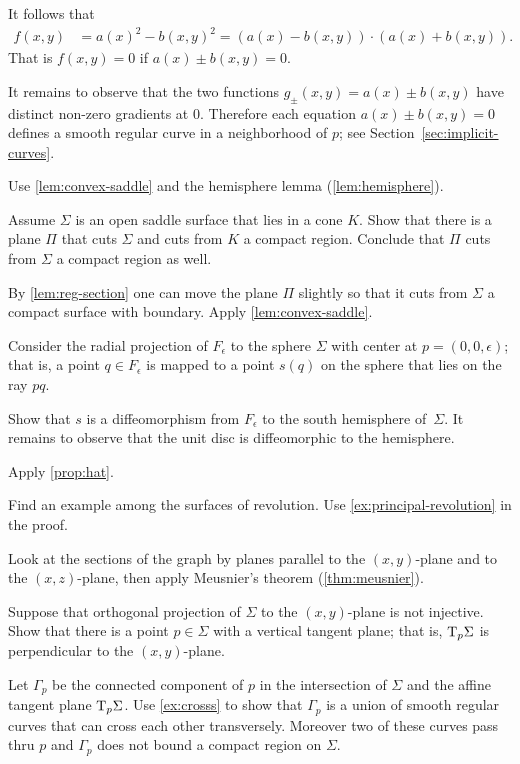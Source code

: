 It follows that 
\begin{align*}
f(x,y)&=a(x)^2-b(x,y)^2=
(a(x)-b(x,y))\cdot (a(x)+b(x,y)).
\end{align*}
That is $f(x,y)=0$ if $a(x)\pm b(x,y) =0$.

It remains to observe that the two functions $g_\pm(x,y)=a(x)\pm b(x,y)$ have distinct non-zero gradients at $0$.
Therefore each equation $a(x)\pm b(x,y) =0$ defines a smooth regular curve in a neighborhood of $p$;
see Section~\ref{sec:implicit-curves}.





 Use \ref{lem:convex-saddle} and the hemisphere lemma (\ref{lem:hemisphere}).

Assume $\Sigma$ is an open saddle surface that lies in a cone $K$.
Show that there is a plane $\Pi$ that cuts $\Sigma$ and cuts from $K$ a compact region.
Conclude that $\Pi$ cuts from $\Sigma$ a compact region as well.

By \ref{lem:reg-section} one can move the plane $\Pi$ slightly so that it cuts from $\Sigma$ a compact surface with boundary.
Apply \ref{lem:convex-saddle}.


Consider the radial projection of $F_\epsilon$ to the sphere $\Sigma$ with center at $p=(0,0,\epsilon)$;
that is, a point $q\in F_\epsilon$ is mapped to a point $s(q)$ on the sphere that lies on the ray $pq$.

Show that $s$ is a diffeomorphism from $F_\epsilon$ to the south hemisphere of~$\Sigma$.
It remains to observe that the  unit disc is diffeomorphic to the hemisphere.

 Apply \ref{prop:hat}.


Find an example among the surfaces of revolution.
Use \ref{ex:principal-revolution} in the proof.

 Look at the sections of the graph by planes parallel to the $(x,y)$-plane and to the $(x,z)$-plane, then apply Meusnier’s theorem (\ref{thm:meusnier}).

Suppose that orthogonal projection of $\Sigma$ to the $(x,y)$-plane is not injective.
Show that there is a point $p\in\Sigma$ with a vertical tangent plane;
that is, $\mathrm{T}_p\Sigma$ is perpendicular to the $(x,y)$-plane.

Let $\Gamma_p$ be the connected component of $p$ in the intersection of $\Sigma$ and the affine tangent plane $\mathrm{T}_p\Sigma$.
Use \ref{ex:crosss} to show that $\Gamma_p$ is a union of smooth regular curves that can cross each other transversely.
Moreover two of these curves pass thru $p$ and $\Gamma_p$ does not bound a compact region on $\Sigma$.

